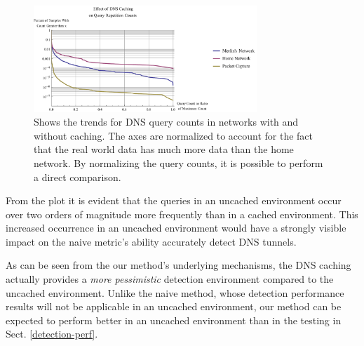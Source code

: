 \documentclass{llncs}
\begin{document}
\begin{figure}[h]
\centering
\includegraphics[width=0.75\textwidth]{../figures/caching.pdf}
\caption[Effect of DNS Caching on Query Counts]{Shows the trends for DNS query
counts in networks with and without caching. The axes are normalized to account
for the fact that the real world data has much more data than the home network.
By normalizing the query counts, it is possible to perform a direct comparison.}
\label{caching}
\end{figure}

From the plot
it is evident that the queries in an uncached environment occur over two
orders of magnitude more frequently than in a cached environment. This increased
occurrence in an uncached environment would have a strongly visible impact on
the naive metric's ability accurately detect DNS tunnels.

As can be seen from the our method's underlying mechanisms, the DNS
caching actually provides a \emph{more pessimistic} detection
environment compared to the uncached environment. Unlike the naive
method, whose detection performance results will not be applicable in
an uncached environment, our method can be expected to
perform better in an uncached environment than in the testing in
Sect. \ref{detection-perf}.

\end{document}
